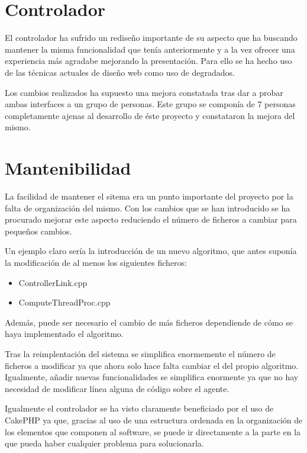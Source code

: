 \section{Controlador}

El controlador ha sufrido un rediseño importante de su aspecto que ha buscando mantener la misma funcionalidad que tenía anteriormente y a la vez ofrecer una experiencia más agradabe mejorando la presentación. Para ello se ha hecho uso de las técnicas actuales de diseño web como uso de degradados.

Los cambios realizados ha supuesto una mejora constatada tras dar a probar ambas interfaces a un grupo de personas. Este grupo se componía de 7 personas completamente ajenas al desarrollo de éste proyecto y constataron la mejora del mismo.

\section{Mantenibilidad}

La facilidad de mantener el sitema era un punto importante del proyecto por la falta de organización del mismo. Con los cambios que se han introducido se ha procurado mejorar este aspecto reduciendo el número de ficheros a cambiar para pequeños cambios.

Un ejemplo claro sería la introducción de un nuevo algoritmo, que antes suponía la modificación de al menos los siguientes ficheros:

\begin{itemize}
	\item ControllerLink.cpp
	\item ComputeThreadProc.cpp
\end{itemize}

Además, puede ser necesario el cambio de más ficheros dependiende de cómo se haya implementado el algoritmo.

Tras la reimplentación del sistema se simplifica enormemente el número de ficheros a modificar ya que ahora solo hace falta cambiar el del propio algoritmo. Igualmente, añadir nuevas funcionalidades se simplifica enormente ya que no hay necesidad de modificar línea alguna de código sobre el agente.

Igualmente el controlador se ha visto claramente beneficiado por el uso de CakePHP ya que, gracias al uso de una estructura ordenada en la organización de los elementos que componen al software, se puede ir directamente a la parte en la que pueda haber cualquier problema para solucionarla.
